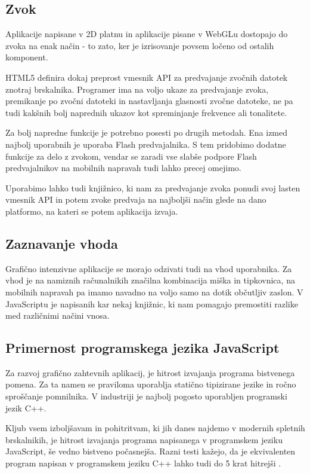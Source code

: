\subsection{Zvok}

Aplikacije napisane v 2D platnu in aplikacije pisane v WebGLu dostopajo do zvoka na enak način - to zato, ker je izrisovanje povsem ločeno od ostalih komponent.

HTML5 definira dokaj preprost vmesnik API za predvajanje zvočnih datotek znotraj brskalnika. Programer ima na voljo ukaze za predvajanje zvoka, premikanje po zvočni datoteki in nastavljanja glasnosti zvočne datoteke, ne pa tudi kakšnih bolj naprednih ukazov kot spreminjanje frekvence ali tonalitete.

Za bolj napredne funkcije je potrebno posesti po drugih metodah. Ena izmed najbolj uporabnih je uporaba Flash predvajalnika. S tem pridobimo dodatne funkcije za delo z zvokom, vendar se zaradi vse slabše podpore Flash predvajalnikov na mobilnih napravah tudi lahko precej omejimo. 

Uporabimo lahko tudi knjižnico, ki nam za predvajanje zvoka ponudi svoj lasten vmesnik API in potem zvoke predvaja na najboljši način glede na dano platformo, na kateri se potem aplikacija izvaja.

\subsection{Zaznavanje vhoda}

Grafično intenzivne aplikacije se morajo odzivati tudi na vhod uporabnika. Za vhod je na namiznih računalnikih značilna kombinacija miška in tipkovnica, na mobilnih napravah pa imamo navadno na voljo samo na dotik občutljiv zaslon. V JavaScriptu je napisanih kar nekaj knjižnic, ki nam pomagajo premostiti razlike med različnimi načini vnosa.

\subsection{Primernost programskega jezika JavaScript}

Za razvoj grafično zahtevnih aplikacij, je hitrost izvajanja programa bistvenega pomena. Za ta namen se praviloma uporablja statično tipizirane jezike in ročno sproščanje pomnilnika. V industriji je najbolj pogosto uporabljen programski jezik C++.

Kljub vsem izboljšavam in pohitritvam, ki jih danes najdemo v modernih spletnih brskalnikih, je hitrost izvajanja programa napisanega v programskem jeziku JavaScript, še vedno bistveno počasnejša. Razni testi kažejo, da je ekvivalenten program napisan v programskem jeziku C++ lahko tudi do 5 krat hitrejši \cite{jsperformance}.

